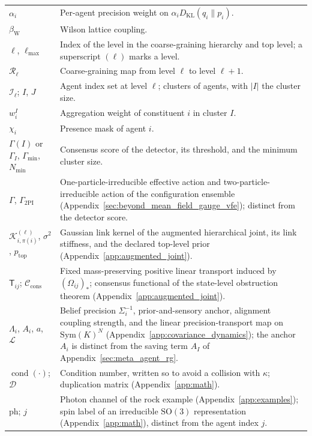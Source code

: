 \documentclass[11pt]{article}
\begin{document}
{\begin{longtable}{@{}p{}p{}@{}}
$\alpha_i$ & Per-agent precision weight on $\alpha_iD_{\mathrm{KL}}(q_i\|p_i)$. \\
$\beta_{\mathrm{W}}$ & Wilson lattice coupling. \\
$\ell$, $\ell_{\max}$ & Index of the level in the coarse-graining hierarchy and top level; a superscript $(\ell)$ marks a level. \\
$\mathcal{R}_\ell$ & Coarse-graining map from level $\ell$ to level $\ell+1$. \\
$\mathcal{I}_\ell$; $I$, $J$ & Agent index set at level $\ell$; clusters of agents, with $|I|$ the cluster size. \\
$w_i^I$ & Aggregation weight of constituent $i$ in cluster $I$. \\
$\chi_i$ & Presence mask of agent $i$. \\
$\Gamma(I)$ or $\Gamma_I$, $\Gamma_{\min}$, $N_{\min}$ & Consensus score of the detector, its threshold, and the minimum cluster size. \\
$\Gamma$, $\Gamma_{\mathrm{2PI}}$ & One-particle-irreducible effective action and two-particle-irreducible action of the configuration ensemble (Appendix~\ref{sec:beyond_mean_field_gauge_vfe}); distinct from the detector score. \\
$\mathcal{K}^{(\ell)}_{i,\pi(i)}$, $\sigma^2$, $p_{\mathrm{top}}$ & Gaussian link kernel of the augmented hierarchical joint, its link stiffness, and the declared top-level prior (Appendix~\ref{app:augmented_joint}). \\
$\mathsf{T}_{ij}$; $\mathcal{C}_{\mathrm{cons}}$ & Fixed mass-preserving positive linear transport induced by $(\Omega_{ij})_*$; consensus functional of the state-level obstruction theorem (Appendix~\ref{app:augmented_joint}). \\
$\Lambda_i$, $A_i$, $a$, $\mathcal{L}$ & Belief precision $\Sigma_i^{-1}$, prior-and-sensory anchor, alignment coupling strength, and the linear precision-transport map on $\mathrm{Sym}(K)^N$ (Appendix~\ref{app:covariance_dynamics}); the anchor $A_i$ is distinct from the saving term $A_I$ of Appendix~\ref{sec:meta_agent_rg}. \\
$\operatorname{cond}(\cdot)$; $\mathcal{D}$ & Condition number, written so to avoid a collision with $\kappa$; duplication matrix (Appendix~\ref{app:math}). \\
$\mathrm{ph}$; $j$ & Photon channel of the rock example (Appendix~\ref{app:examples}); spin label of an irreducible $\mathrm{SO}(3)$ representation (Appendix~\ref{app:math}), distinct from the agent index $j$. \\

\end{longtable}}
\end{document}
